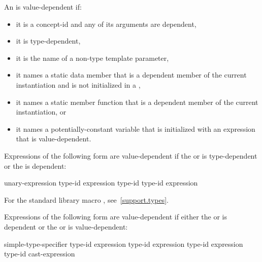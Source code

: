 \pnum
An
is value-dependent if:
\begin{itemize}
\item
it is a concept-id and any of its arguments are dependent,
\item
it is type-dependent,
\item
it is the name of a non-type template parameter,
\item
it names a static data member that is a dependent member of the current
instantiation and is not initialized in a ,
\item
it names a static member function that is a dependent member of the current
instantiation, or
\item
it names a potentially-constant variable
that is initialized with an expression that is value-dependent.
\end{itemize}

Expressions of the following form are value-dependent if the
 or 
is type-dependent or the
is dependent:

\begin{ncsimplebnf}
 unary-expression\br
{} \terminal{(} type-id \terminal{)}\br
{} \terminal{(} expression \terminal{)}\br
{} \terminal{(} type-id \terminal{)}\br
{} \terminal{(} type-id \terminal{)}\br
{} \terminal{(} expression \terminal{)}
\end{ncsimplebnf}

\begin{note}
For the standard library macro ,
see~\ref{support.types}.
\end{note}

\pnum
Expressions of the following form are value-dependent if either the
or
is dependent or the
or
is value-dependent:

\begin{ncsimplebnf}
simple-type-specifier \terminal{(}  \terminal{)}\br
{} \terminal{<} type-id \terminal{>} \terminal{(} expression \terminal{)}\br
{} \terminal{<} type-id \terminal{>} \terminal{(} expression \terminal{)}\br
{} \terminal{<} type-id \terminal{>} \terminal{(} expression \terminal{)}\br
\terminal{(} type-id \terminal{)} cast-expression
\end{ncsimplebnf}

